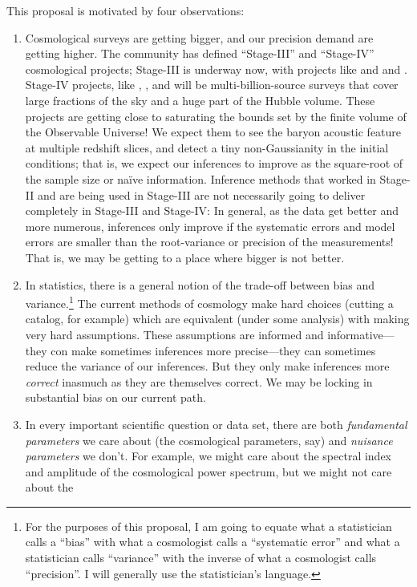 \documentclass[12pt]{article}
\begin{document}
This proposal is motivated by four observations:
\begin{enumerate}
\item
Cosmological surveys are getting bigger, and our precision demand are
getting higher.
The community has defined ``Stage-III'' and ``Stage-IV'' cosmological
projects; Stage-III is underway now, with projects like \boss and \des
and \panstarrs.
Stage-IV projects, like \lsst, \euclid, and \wfirst will be
multi-billion-source surveys that cover large fractions of the sky and
a huge part of the Hubble volume.
These projects are getting close to saturating the bounds set by the
finite volume of the Observable Universe!
We expect them to see the baryon acoustic feature at multiple redshift
slices, and detect a tiny non-Gaussianity in the initial conditions;
that is, we expect our inferences to improve as the square-root of the
sample size or na\"ive information.
Inference methods that worked in Stage-II and are being used in
Stage-III are not necessarily going to deliver completely in Stage-III
and Stage-IV:
In general, as the data get better and more numerous, inferences only
improve if the systematic errors and model errors are smaller than the
root-variance or precision of the measurements!
That is, we may be getting to a place where bigger is not better.
\item
In statistics, there is a general notion of the trade-off between bias
and variance.\footnote{For the purposes of this proposal, I am going to equate what a
statistician calls a ``bias'' with what a cosmologist calls a
``systematic error'' and what a statistician calls ``variance'' with
the inverse of what a cosmologist calls ``precision''.  I will
generally use the statistician's language.}
The current methods of cosmology make hard choices (cutting a catalog,
for example) which are equivalent (under some analysis) with making
very hard assumptions.
These assumptions are informed and informative---they con make sometimes inferences
more precise---they can sometimes reduce the variance of our inferences.
But they only make inferences more \emph{correct} inasmuch as they are
themselves correct.
We may be locking in substantial bias on our current path.
\item
In every important scientific question or data set, there are both
\emph{fundamental parameters} we care about (the cosmological
parameters, say) and \emph{nuisance parameters} we don't.
For example, we might care about the spectral index and amplitude of
the cosmological power spectrum, but we might not care about the

\end{enumerate}
\end{document}
